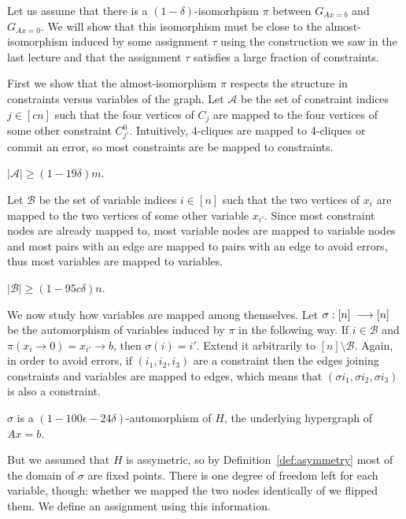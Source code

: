 \documentclass[a4paper,twoside,justified]{tufte-handout}
\newcommand{\Glin}[1]{G_{Ax=#1}}
\begin{document}
Let us assume that there is a $(1-\delta)$-isomorhpism $\pi$ between $\Glin{b}$ and $\Glin{0}$. We will show that this isomorphism must be close to the almost-isomorphism induced by some assignment $\tau$ using the construction we saw in the last lecture and that the assignment $\tau$ satisfies a large fraction of constraints.

First we show that the almost-isomorphism $\pi$ respects the structure in constraints versus variables of the graph.
Let $\mathcal{A}$ be the set of constraint indices $j\in[cn]$ such that the four vertices of $C_j$ are mapped to the four vertices of some other constraint $C_{j'}^0$. Intuitively, 4-cliques are mapped to 4-cliques or commit an error, so most constraints are be mapped to constraints.

\begin{claim}
  \label{claim:constraints-map-to-constraints}
  $|\mathcal{A}| \geq (1-19\delta) m$.
\end{claim}

Let $\mathcal{B}$ be the set of variable indices $i\in [n]$ such that the two vertices of $x_i$ are mapped to the two vertices of some other variable $x_{i'}$. Since most constraint nodes are already mapped to, most variable nodes are mapped to variable nodes and most pairs with an edge are mapped to pairs with an edge to avoid errors, thus most variables are mapped to variables.

\begin{claim}
  \label{claim:variables-map-to-variables}
  $|\mathcal{B}| \geq (1-95c\delta) n$.
\end{claim}

We now study how variables are mapped among themselves. Let $\sigma:[n]\:\longrightarrow [n]$ be the automorphism of variables induced by $\pi$ in the following way. If $i\in\mathcal{B}$ and $\pi(x_i\to0)=x_{i'}\to b$, then $\sigma(i)=i'$. Extend it arbitrarily to $[n]\setminus \mathcal{B}$. Again, in order to avoid errors, if $(i_1,i_2,i_3)$ are a constraint then the edges joining constraints and variables are mapped to edges, which means that $(\sigma i_1, \sigma i_2, \sigma i_3)$ is also a constraint.

\begin{claim}
  \label{claim:sigma-almost-automorphism}
  $\sigma$ is a $(1-100\epsilon-24\delta)$-automorphism of $H$, the underlying hypergraph of $Ax=b$.
\end{claim}

But we assumed that $H$ is assymetric, so by Definition~\ref{def:asymmetry} most of the domain of $\sigma$ are fixed points. There is one degree of freedom left for each variable, though: whether we mapped the two nodes identically of we flipped them. We define an assignment using this information.
\end{document}
